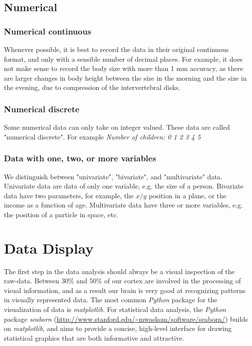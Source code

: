 \subsection{Numerical}

\subsubsection{Numerical continuous}
Whenever possible, it is best to record the data in their original continuous format, and only with a sensible number of decimal places. For example, it does not make sense to record the body size with more than 1 mm accuracy, as there are larger changes in body height between the size in the morning and the size in the evening, due to compression of the intervertebral disks.

\subsubsection{Numerical discrete}
Some numerical data can only take on integer valued. These data are called "numerical discrete". For example \emph{Number of children: 0 1 2 3 4 5}

\subsubsection{Data with one, two, or more variables}

We distinguish between "univariate", "bivariate", and "multivariate" data. Univariate data  are data of only one variable, e.g. the size of a person. Bivariate data  have two parameters, for example, the $x/y$ position in a plane, or the income as a function of age. Multivariate data  have three or more variables, e.g. the position of a particle in space, etc.

\section{Data Display}

The first step in the data analysis should always be a visual inspection of the raw-data. Between 30\% and 50\% of our cortex are involved in the processing of visual information, and as a result our brain is very good at recognizing patterns in visually represented data.
The most common \emph{Python} package for the visualization of data is \emph{matplotlib}. For statistical data analysis, the \emph{Python} package \emph{seaborn} (\url{http://www.stanford.edu/~mwaskom/software/seaborn/}) builds on \emph{matplotlib}, and aims to provide a concise, high-level interface for drawing statistical graphics that are both informative and attractive.

